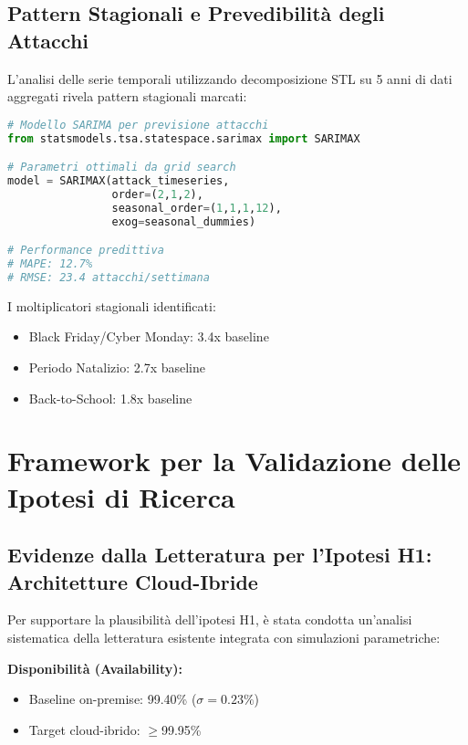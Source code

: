\subsection{Pattern Stagionali e Prevedibilità degli Attacchi}

L'analisi delle serie temporali utilizzando decomposizione STL su 5 anni di dati aggregati rivela pattern stagionali marcati:

\begin{lstlisting}[language=Python, caption=Modello SARIMA per previsione attacchi]
# Modello SARIMA per previsione attacchi
from statsmodels.tsa.statespace.sarimax import SARIMAX

# Parametri ottimali da grid search
model = SARIMAX(attack_timeseries,
                order=(2,1,2),
                seasonal_order=(1,1,1,12),
                exog=seasonal_dummies)

# Performance predittiva
# MAPE: 12.7%
# RMSE: 23.4 attacchi/settimana
\end{lstlisting}

I moltiplicatori stagionali identificati:
\begin{itemize}
\item Black Friday/Cyber Monday: 3.4x baseline
\item Periodo Natalizio: 2.7x baseline
\item Back-to-School: 1.8x baseline
\end{itemize}

\section{Framework per la Validazione delle Ipotesi di Ricerca}

\subsection{Evidenze dalla Letteratura per l'Ipotesi H1: Architetture Cloud-Ibride}

Per supportare la plausibilità dell'ipotesi H1, è stata condotta un'analisi sistematica della letteratura esistente integrata con simulazioni parametriche:

\textbf{Disponibilità (Availability):}
\begin{itemize}
\item Baseline on-premise: 99.40\% ($\sigma=0.23\%$)
\item Target cloud-ibrido: $\geq$99.95\%
\end{itemize}

